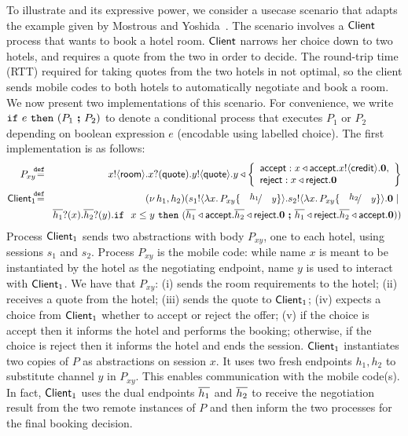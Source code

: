 \begin{example}\label{exam:proc}
To illustrate \HOp and its expressive power, 
we consider a usecase scenario that adapts the example given by Mostrous and Yoshida~\cite{MostrousY15}.
The scenario involves a $\mathsf{Client}$ process that wants to book
a hotel room. %
$\mathsf{Client}$
narrows  her choice down to two hotels, and requires 
 a quote from the two in order to
decide. The round-trip time (RTT) required for
taking quotes from the two hotels in not optimal, %
so the client  sends mobile codes to both hotels
to automatically negotiate and book a room. 
We now present two \HOp implementations of this scenario.
For convenience, we write $\mathtt{if}\  e\ \mathtt{then}\  (P_1\ \boldsymbol{;} \ P_2)$ 
to denote a conditional process that executes $P_1$ or $P_2$ depending on boolean expression $e$ (encodable using labelled choice).
The first implementation is  as follows:
%
	\begin{eqnarray*}%
		 P_{xy}  \!\!\! & \defeq &  \!\!\! \bout{x}{\rtype} \binp{x}{\Quote} \bout{y}{\Quote}
		y \triangleleft \left\{
				\begin{array}{l}
					\accept: \bsel{x}{\accept} \bout{x}{\creditc} \inact,\\
					\reject: \bsel{x}{\reject} \inact
				\end{array}
				\right\}
		\\ %
		 \Client_1 \!\!\! & \defeq  &  \!\!\! \newsp{h_1, h_2}{\bout{s_1}{\abs{x}{P_{xy} \subst{h_1}{y}}} \bout{s_2}{\abs{x}{P_{xy} \subst{h_2}{y}}} \inact \Par  \\
		& & 
		\!\!\! \binp{\dual{h_1}}{x} \binp{\dual{h_2}}{y}  \If\ x \leq y\   \Then (\bsel{\dual{h_1}}{\accept} \bsel{\dual{h_2}}{\reject} \inact \ \Else \ \bsel{\dual{h_1}}{\reject} \bsel{\dual{h_2}}{\accept} \inact )
		}
	\end{eqnarray*}
%
Process $\mathsf{Client}_1$ sends two abstractions with body $P_{xy}$, one to each hotel, 
		using sessions $s_1$ and $s_2$.
	Process $P_{xy}$ is the mobile code: %
	while
		name $x$ is meant to be instantiated by the hotel as the negotiating
		endpoint, name $y$ is used to interact with $\mathsf{Client}_1$.	
		We have that $P_{xy}$: (i)  sends the room requirements to the hotel;
		(ii) receives a quote from the hotel;
		(iii) sends the quote to  $\mathsf{Client}_1$;
		(iv) expects a choice from   $\mathsf{Client}_1$ whether to accept or reject the offer;
		(v) if the choice is accept then it informs the hotel and performs the booking;
		otherwise, if the choice is reject then it informs the hotel and ends the session.
				$\mathsf{Client}_1$ instantiates two copies of  $P$ as abstractions
		on session $x$. It uses two
		fresh endpoints $h_1, h_2$ to substitute channel $y$
		in $P_{xy}$. This enables communication with the mobile code(s).
		In fact, 
		$\mathsf{Client}_1$ uses the dual endpoints $\overline{h_1}$ and $\overline{h_2}$
		to receive the negotiation
		result from the two remote instances of $P$ and then inform the two
		processes for the final booking decision.


\end{example}
